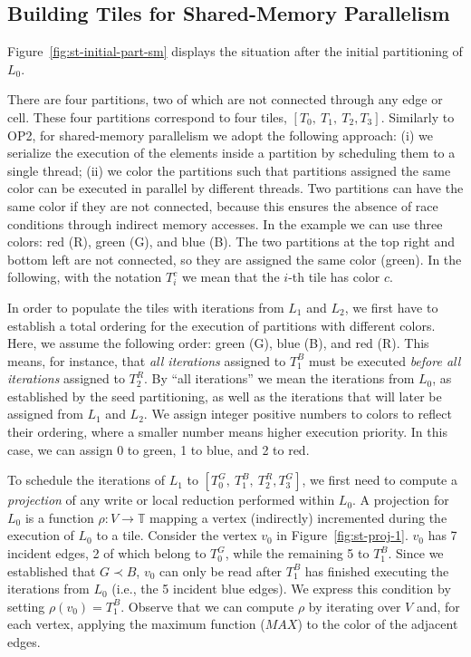 \subsection{Building Tiles for Shared-Memory Parallelism}
Figure~\ref{fig:st-initial-part-sm} displays the situation after the initial partitioning of $L_0$. 

There are four partitions, two of which are not connected through any edge or cell. These four partitions correspond to four tiles, $[T_0,\ T_1,\ T_2, T_3]$. Similarly to OP2, for shared-memory parallelism we adopt the following approach: (i) we serialize the execution of the elements inside a partition by scheduling them to a single thread; (ii) we color the partitions such that partitions assigned the same color can be executed in parallel by different threads. Two partitions can have the same color if they are not connected, because this ensures the absence of race conditions through indirect memory accesses. In the example we can use three colors: red (R), green (G), and blue (B). The two partitions at the top right and bottom left are not connected, so they are assigned the same color (green). In the following, with the notation $T_i^c$ we mean that the $i$-th tile has color $c$.

In order to populate the tiles with iterations from $L_1$ and $L_2$, we first have to establish a total ordering for the execution of partitions with different colors. Here, we assume the following order: green (G), blue (B), and red (R). This means, for instance, that \textit{all iterations} assigned to $T_1^B$ must be executed \textit{before all iterations} assigned to $T_2^R$. By ``all iterations'' we mean the iterations from $L_0$, as established by the seed partitioning, as well as the iterations that will later be assigned from $L_1$ and $L_2$. We assign integer positive numbers to colors to reflect their ordering, where a smaller number means higher execution priority. In this case, we can assign 0 to green, 1 to blue, and 2 to red.

To schedule the iterations of $L_1$ to $[T_0^G,\ T_1^B,\ T_2^R, T_3^G]$, we first need to compute a \textit{projection} of any write or local reduction performed within $L_0$.  A projection for $L_0$ is a function $\rho : V \rightarrow \mathbb{T}$ mapping a vertex (indirectly) incremented during the execution of $L_0$ to a tile.  Consider the vertex $v_0$ in Figure~\ref{fig:st-proj-1}. $v_0$ has 7 incident edges, 2 of which belong to $T_0^G$, while the remaining 5 to $T_1^B$. Since we established that $G \prec B$, $v_0$ can only be read after $T_1^B$ has finished executing the iterations from $L_0$ (i.e., the 5 incident blue edges). We express this condition by setting $\rho(v_0) = T_1^B$. Observe that we can compute $\rho$ by iterating over $V$ and, for each vertex, applying the maximum function ($MAX$) to the color of the adjacent edges. 

